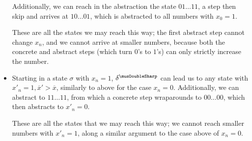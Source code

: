 \documentclass[acmsmall,screen]{acmart}
\newcommand{\ov}{\overline}
\newcommand{\tr}{\delta}
\renewcommand{\vec}{\ov}
\newcommand{\absr}[1]{{#1}^{\musDoubleSharp}}
\begin{document}
\begin{example}
\begin{itemize}
	Additionally, we can reach in the abstraction the state $01\ldots11$, a step then skip and arrives at $10\ldots01$, which is abstracted to all numbers with $x_0=1$.

	These are all the states we may reach this way; the first abstract step cannot change $x_n$, and we cannot arrive at smaller numbers, because both the concrete and abstract steps (which turn $0$'s to $1$'s) can only strictly increase the number.

	\item Starting in a state $\sigma$ with $x_n=1$, $\absr{\tr}$ can lead us to any state with $x'_n=1,\vec{x}' > \vec{x}$, similarly to above for the case $x_n=0$. Additionally, we can abstract to $11\ldots11$, from which a concrete step wraparounds to $00\ldots00$, which then abstracts to $x'_n=0$.

	These are all the states that we may reach this way; we cannot reach smaller numbers with $x'_n=1$, along a similar argument to the case above of $x_n=0$.
\end{itemize}
\end{example}

%
%
%
%
%
%
%
%
%
%
%
%
%
%
%
%
%
%

%

%

%
%
%
%
%
%
%
%
%
%
%
%
%
%
%
%
%
%
%
%

%

%
%
%

%
%
%
%
%
%
%
%

%
%
%
%
%
%
%
%
%
%
%
%
%
%

%
%
%
%

%

%
%
%

%
%
%
%
%
%
%
%
%
%
%

%
%
%

%
%
%
%
%
%
%

%
%

%

%
%
%
%

%
%
%
%
%
%
%
%
%
%
%
%

%
%
%
%

%
%
%
%

%

%

%
%
%
%
%
%
%
%
%
%
%
%
%

%
%
%
%
%
%
%
%
%
%
%

%
%
%
%
%
%
%
%
%
%

%

%
\end{document}
